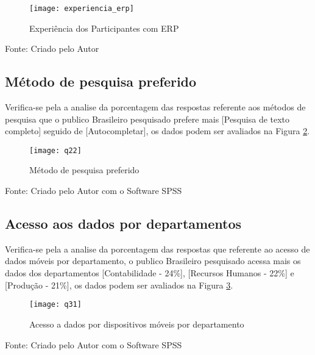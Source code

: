 \begin{figure}[H]
	\centering	
	\caption{Experiência dos Participantes com ERP}
	\texttt{[image: experiencia\_erp]}
	\label{fig:figura-experp}
\end{figure}
\vspace{-0.8 cm} \hspace{2.65 cm} Fonte: Criado pelo Autor\newline

\subsection{Método de pesquisa preferido}

Verifica-se pela a analise da porcentagem das respostas referente aos métodos de pesquisa que o publico Brasileiro pesquisado prefere mais [Pesquisa de texto completo] seguido de [Autocompletar], os dados podem ser avaliados na Figura \ref{fig:figura-q22}.

\begin{figure}[H]
	\centering	
	\caption{Método de pesquisa preferido}
	\texttt{[image: q22]}
	\label{fig:figura-q22}
\end{figure}
\vspace{-0.8 cm} \hspace{3.15 cm} Fonte: Criado pelo Autor com o Software SPSS\newline

\subsection{Acesso aos dados por departamentos}

Verifica-se pela a analise da porcentagem das respostas que referente ao acesso de dados móveis por departamento, o publico Brasileiro pesquisado acessa mais os dados dos departamentos [Contabilidade - 24\%], [Recursos Humanos - 22\%] e [Produção - 21\%], os dados podem ser avaliados na Figura \ref{fig:figura-q31}.

\begin{figure}[H]
	\centering	
	\caption{Acesso a dados por dispositivos móveis por departamento}
	\texttt{[image: q31]}
	\label{fig:figura-q31}
\end{figure}
\vspace{-0.8 cm} \hspace{3.15 cm} Fonte: Criado pelo Autor com o Software SPSS\newline

